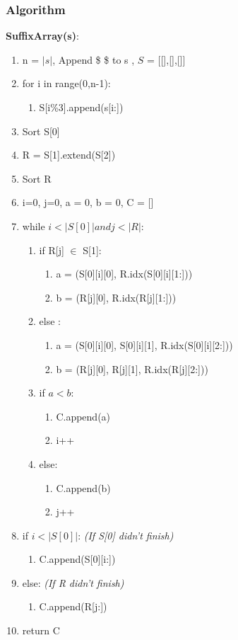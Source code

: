 \subsubsection{Algorithm}
\textbf{SuffixArray(s)}:
\begin{enumerate}[label=\Alph*]
    \item n = $|s|$, Append \$ \$ to s , $S$ = [[],[],[]]
    \item for i in range(0,n-1):
    \begin{enumerate}
        \item [] S[i\%3].append(s[i:])
    \end{enumerate}
    \item Sort S[0]
    \item R = S[1].extend(S[2])
    \item Sort R
    \item i=0, j=0, a = 0, b = 0, C = []
    \item while \( i<|S[0]| and j<|R|\):
\begin{enumerate}[label=\arabic*]
    \item if R[j] $\in$ S[1]:
    \begin{enumerate}
        \item a = (S[0][i][0], R.idx(S[0][i][1:]))
        \item b = (R[j][0], R.idx(R[j][1:]))
    \end{enumerate}
    \item [] else :
    \begin{enumerate}
        \item a = (S[0][i][0], S[0][i][1],  R.idx(S[0][i][2:]))
        \item b = (R[j][0], R[j][1], R.idx(R[j][2:]))
    \end{enumerate}    
    \item if \(a < b\):
    \begin{enumerate}
        \item C.append(a)
        \item i++
    \end{enumerate}      
    \item [] else:
    \begin{enumerate}
        \item C.append(b)
        \item j++
    \end{enumerate}      
\end{enumerate}   
\item if \(i < |S[0]| \): \emph{(If S[0] didn't finish)}
\begin{enumerate}
    \item C.append(S[0][i:])
\end{enumerate}
\item[] else: \emph{(If R didn't finish)}
\begin{enumerate}
    \item C.append(R[j:])
\end{enumerate}
\item return C
\end{enumerate}    

